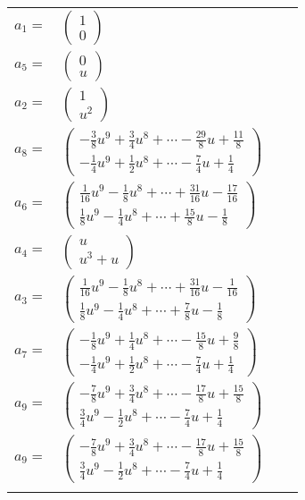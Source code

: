 \documentclass[1p]{elsarticle_modified}
\theoremstyle{definition}
\begin{document}
\begin{tabular}{m{7pt} m{180pt} m{7pt} m{180pt} }
\flushright $a_{1}=$&$\begin{pmatrix}1\\0\end{pmatrix}$ \\
\flushright $a_{5}=$&$\begin{pmatrix}0\\u\end{pmatrix}$ \\
\flushright $a_{2}=$&$\begin{pmatrix}1\\u^2\end{pmatrix}$ \\
\flushright $a_{8}=$&$\begin{pmatrix}-\frac{3}{8} u^9+\frac{3}{4} u^8+\cdots-\frac{29}{8} u+\frac{11}{8}\\-\frac{1}{4} u^9+\frac{1}{2} u^8+\cdots-\frac{7}{4} u+\frac{1}{4}\end{pmatrix}$ \\
\flushright $a_{6}=$&$\begin{pmatrix}\frac{1}{16} u^9-\frac{1}{8} u^8+\cdots+\frac{31}{16} u-\frac{17}{16}\\\frac{1}{8} u^9-\frac{1}{4} u^8+\cdots+\frac{15}{8} u-\frac{1}{8}\end{pmatrix}$ \\
\flushright $a_{4}=$&$\begin{pmatrix}u\\u^3+u\end{pmatrix}$ \\
\flushright $a_{3}=$&$\begin{pmatrix}\frac{1}{16} u^9-\frac{1}{8} u^8+\cdots+\frac{31}{16} u-\frac{1}{16}\\\frac{1}{8} u^9-\frac{1}{4} u^8+\cdots+\frac{7}{8} u-\frac{1}{8}\end{pmatrix}$ \\
\flushright $a_{7}=$&$\begin{pmatrix}-\frac{1}{8} u^9+\frac{1}{4} u^8+\cdots-\frac{15}{8} u+\frac{9}{8}\\-\frac{1}{4} u^9+\frac{1}{2} u^8+\cdots-\frac{7}{4} u+\frac{1}{4}\end{pmatrix}$ \\
\flushright $a_{9}=$&$\begin{pmatrix}-\frac{7}{8} u^9+\frac{3}{4} u^8+\cdots-\frac{17}{8} u+\frac{15}{8}\\\frac{3}{4} u^9-\frac{1}{2} u^8+\cdots-\frac{7}{4} u+\frac{1}{4}\end{pmatrix}$\\ \flushright $a_{9}=$&$\begin{pmatrix}-\frac{7}{8} u^9+\frac{3}{4} u^8+\cdots-\frac{17}{8} u+\frac{15}{8}\\\frac{3}{4} u^9-\frac{1}{2} u^8+\cdots-\frac{7}{4} u+\frac{1}{4}\end{pmatrix}$\\&\end{tabular}
\end{document}
